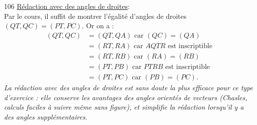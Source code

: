 \begin{Soln}{106}
\underline{Rédaction avec des angles de droites}:\\
Par le cours,  il suffit de montrer l'égalité d'angles de droites $(QT,QC)=(PT,PC)$. Or on a :
\begin{align*}
(QT,QC)&=(QT,QA) \text{ car $(QC)=(QA)$}\\
&=(RT,RA) \text{ car $AQTR$ est inscriptible} \\
&= (RT,RB) \text{ car $(RA)=(RB)$} \\
&=(PT,PB) \text{ car $PTRB$ est inscriptible} \\
&=(PT,PC) \text{ car $(PB)=(PC)$.}
\end{align*}
\emph{La rédaction avec des angles de droites est sans doute la plus efficace pour ce type d'exercice : elle conserve les avantages des angles orientés de vecteurs (Chasles, calculs faciles à suivre même sans figure), et simplifie la rédaction lorsqu'il y a des angles supplémentaires.}
\end{Soln}
